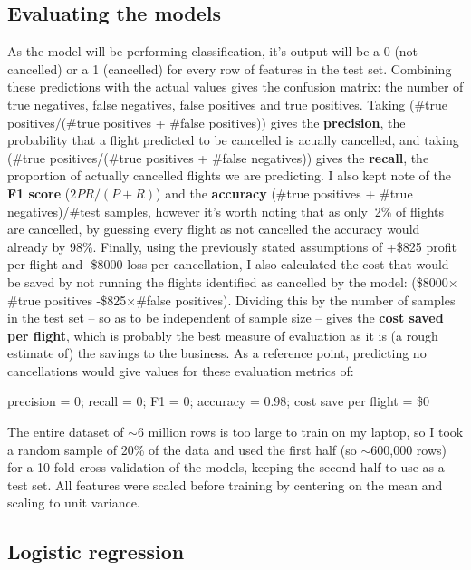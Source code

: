 \documentclass[a4paper]{article}
\begin{document}
\subsection*{Evaluating the models}

As the model will be performing classification, it's output will be a 0 (not cancelled) or a 1 (cancelled) for every row of features in the test set. Combining these predictions with the actual values gives the confusion matrix: the number of true negatives, false negatives, false positives and true positives. Taking (\#true positives/(\#true positives + \#false positives)) gives the {\bf precision}, the probability that a flight predicted to be cancelled is acually cancelled, and taking (\#true positives/(\#true positives + \#false negatives)) gives the {\bf recall}, the proportion of actually cancelled flights we are predicting. I also kept note of the {\bf F1 score} ($2PR/(P+R)$) and the {\bf accuracy} (\#true positives + \#true negatives)/\#test samples, however it's worth noting that as only $~$2\% of flights are cancelled, by guessing every flight as not cancelled the accuracy would already by 98\%. Finally, using the previously stated assumptions of +\$825 profit per flight and -\$8000 loss per cancellation, I also calculated the cost that would be saved by not running the flights identified as cancelled by the model: (\$8000$\times$\#true positives -\$825$\times$\#false positives). Dividing this by the number of samples in the test set -- so as to be independent of sample size -- gives the {\bf cost saved per flight}, which is probably the best measure of evaluation as it is (a rough estimate of) the savings to the business. As a reference point, predicting no cancellations would give values for these evaluation metrics of:

\noindent precision = 0; recall = 0; F1 = 0; accuracy = 0.98; cost save per flight = \$0

The entire dataset of $\sim$6 million rows is too large to train on my laptop, so I took a random sample of 20\% of the data and used the first half (so $\sim$600,000 rows) for a 10-fold cross validation of the models, keeping the second half to use as a test set. All features were scaled before training by centering on the mean and scaling to unit variance.

\subsection*{Logistic regression}
\end{document}
